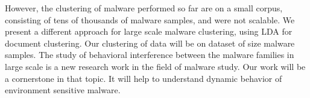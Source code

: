 However, the clustering of malware performed so far are on a small corpus, consisting of tens of thousands of malware samples, and were not scalable.
We present a different approach for large scale malware clustering, using LDA for document clustering.
Our clustering of data will be on dataset of size {\gettotalmalwarei{}} malware samples.
The study of behavioral interference between the malware families in large scale is a new research work in the field of malware study.
Our work will be a cornerstone in that topic.
It will help to understand dynamic behavior of environment sensitive malware.






